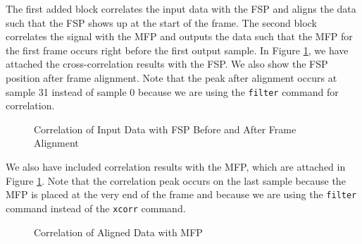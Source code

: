 \documentclass[conference,onecolumn]{IEEEtran}
\begin{document}
The first added block correlates the input data with the FSP and aligns the data such that the FSP shows up at the start of the frame. The second block correlates the signal with the MFP and outputs the data such that the MFP for the first frame occurs right before the first output sample. In Figure \ref{fig::fsp_correlation_gnu_radio}, we have attached the cross-correlation results with the FSP. We also show the FSP position after frame alignment. Note that the peak after alignment occurs at sample 31 instead of sample 0 because we are using the \texttt{filter} command for correlation.

\begin{figure}[H]
	\centerline{}
	\caption{Correlation of Input Data with FSP Before and After Frame Alignment}
	\label{fig::fsp_correlation_gnu_radio}
\end{figure}

We also have included correlation results with the MFP, which are attached in Figure \ref{fig::fsp_correlation_gnu_radio}. Note that the correlation peak occurs on the last sample because the MFP is placed at the very end of the frame and because we are using the \texttt{filter} command instead of the \texttt{xcorr} command.

\begin{figure}[H]
	\centerline{}
	\caption{Correlation of Aligned Data with MFP}
	\label{fig::mfp_correlation_gnu_radio}
\end{figure}

\end{document}
